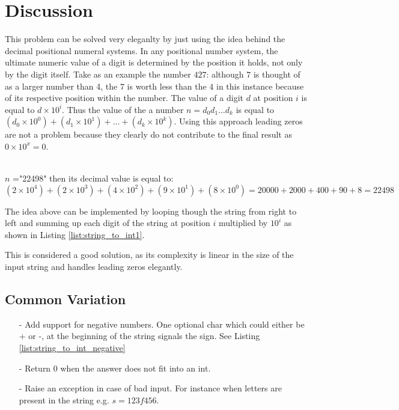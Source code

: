 \section{Discussion}
\label{string_to_int:sec:discussion}
This problem can be solved very eleganlty by just using the idea behind the decimal positional numeral systems.
In any positional number system, the ultimate numeric value of a digit is determined by the position it holds, not only by the digit itself. Take as an example the number $427$:  although $7$ is thought of as a larger number than 4, the $7$ is worth less than the $4$ in this instance because of its respective position within the number. The value of a digit $d$ at position $i$ is equal to $d\times 10^i$. Thus the value of the a number $n=d_0d_1 \ldots d_k$ is equal to $(d_0 \times 10^0) + (d_1 \times 10^1) + \ldots + (d_k \times 10^k)$.
Using this approach leading zeros are not a problem because they clearly do not contribute to the final result as $0 \times 10^x = 0$.
\begin{example}
	\hfill \\
	 $n$ ="22498" then its decimal value is equal to: $(2 \times 10^4) + (2 \times 10^3) + (4 \times 10^2) + (9 \times 10^1) + (8 \times 10^0) = 20000 + 2000 + 400 +90 +8 = 22498$
\end{example}

The idea above can be implemented by looping though the string from right to left and summing up each digit of the string at position $i$  multiplied by $10^i$ as shown in Listing \ref{list:string_to_int1}.




This is considered a good solution, as its complexity is linear in the size of the input string and handles leading zeros elegantly.

\subsection{Common Variation}
\begin{itemize}
	\item[-] Add support for negative numbers. One optional char which could either be + or -, at the beginning of the string  signals the sign. See Listing \ref{list:string_to_int_negative} 
	\item[-] Return $0$ when the answer does not fit into an int.
	\item[-] Raise an exception in case of bad input. For instance when letters are present in the string e.g. $s=123f456$.  
\end{itemize}



